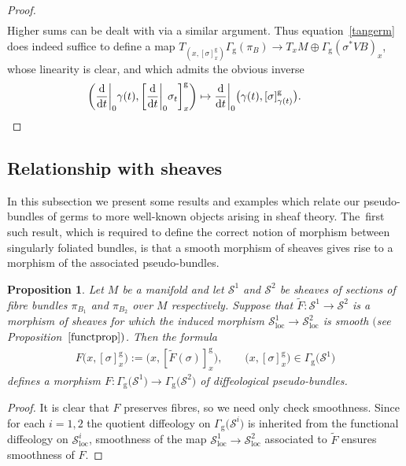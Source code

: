 \documentclass[pdftex]{sigma}
\numberwithin{equation}{section}
\newtheorem{Proposition}[Theorem]{Proposition}
\def\loc{\operatorname{loc}}
\def\g{\operatorname{g}}
\def\SS{{\mathscr{S}}}
\begin{document}
\begin{proof}
\begin{gather*}
\end{gather*}
Higher sums can be dealt with via a similar argument. Thus equation~\eqref{tangerm} does indeed suffice to define a map $T_{\left(x,[\sigma]^{\g}_{x}\right)}\Gamma_{\g}(\pi_{B})\rightarrow T_{x}M\oplus\Gamma_{\g}(\sigma^{*}VB)_{x}$, whose linearity is clear, and which admits the obvious inverse
\begin{gather*}
\bigg(\frac{\rm d}{{\rm d}t}\bigg|_{0}\gamma(t),\bigg[\frac{\rm d}{{\rm d}t}\bigg|_{0}\sigma_{t}\bigg]^{\g}_{x}\bigg)\mapsto \frac{\rm d}{{\rm d}t}\bigg|_{0}\big(\gamma(t),[\sigma]^{\g}_{\gamma(t)}\big).\tag*{\qed}
\end{gather*}
\renewcommand{\qed}{}
\end{proof}

\subsection{Relationship with sheaves}\label{relsheaf}

In this subsection we present some results and examples which relate our pseudo-bundles of germs to more well-known objects arising in sheaf theory. The~first such result, which is required to define the correct notion of morphism between singularly foliated bundles, is that a smooth morphism of sheaves gives rise to a morphism of the associated pseudo-bundles.

\begin{Proposition}\label{relsheaf1}
Let $M$ be a manifold and let $\SS^{1}$ and $\SS^{2}$ be sheaves of sections of fibre bundles $\pi_{B_{1}}$ and $\pi_{B_{2}}$ over $M$ respectively. Suppose that $\tilde{F}\colon \SS^{1}\rightarrow\SS^{2}$ is a morphism of sheaves for which the induced morphism $\SS^{1}_{\loc}\rightarrow\SS^{2}_{\loc}$ is smooth $($see Proposition~$\ref{functprop})$. Then the formula
\begin{gather*}
F\big(x,[\sigma]^{\g}_{x}\big):=\big(x,[\tilde{F}(\sigma)]^{\g}_{x}\big),\qquad \big(x,[\sigma]^{\g}_{x}\big)\in\Gamma_{\g}\big(\SS^{1}\big)
\end{gather*}
defines a morphism $F\colon \Gamma_{\g}\big(\SS^{1}\big)\rightarrow\Gamma_{\g}\big(\SS^{2}\big)$ of diffeological pseudo-bundles.
\end{Proposition}

\begin{proof}
It is clear that $F$ preserves fibres, so we need only check smoothness. Since for each $i=1,2$ the quotient diffeology on $\Gamma_{\g}\big(\SS^{i}\big)$ is inherited from the functional diffeology on $\SS^{i}_{\loc}$, smoothness of the map $\SS^{1}_{\loc}\rightarrow\SS^{2}_{\loc}$ associated to $\tilde{F}$ ensures smoothness of $F$.
\end{proof}
\end{document}
